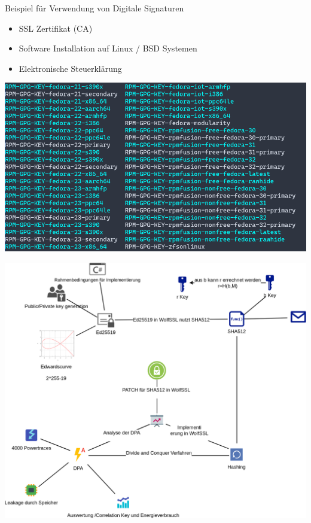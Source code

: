 \documentclass[
  10pt,
  ignorenonframetext,
  aspectratio=43,
]{beamer}
\providecommand{\tightlist}{%
  \setlength{\itemsep}{0pt}\setlength{\parskip}{0pt}}
\begin{document}
\begin{frame}{Beispiel für Verwendung von Digitale Signaturen}
\protect\hypertarget{beispiel-fuxfcr-verwendung-von-digitale-signaturen}{}
\begin{itemize}
\tightlist
\item
  SSL Zertifikat (CA)
\item
  Software Installation auf Linux / BSD Systemen
\item
  Elektronische Steuerklärung
\end{itemize}

\includegraphics[width=\textwidth,height=0.6\textheight]{Abbildungen/GPG.png}
\end{frame}

\begin{frame}{}
\protect\hypertarget{section}{}
\includegraphics{Abbildungen/ITSEC(1)_res.png}
\end{frame}
\end{document}

